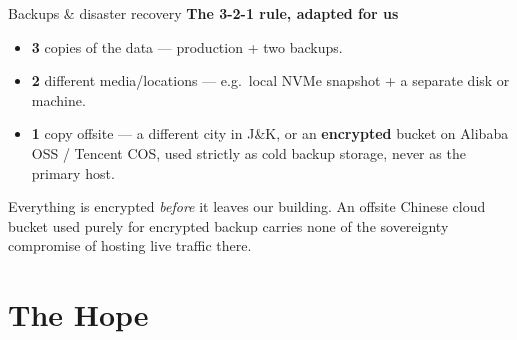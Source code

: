 \documentclass[aspectratio=169,10pt]{beamer}
\newcommand{\eyebrow}[1]{{\small\color{sovGold}\textbf{#1}}}
\begin{document}
\begin{frame}{Backups \& disaster recovery}
  \eyebrow{The 3-2-1 rule, adapted for us}
  \begin{itemize}
    \item \textbf{3} copies of the data --- production + two backups.
    \item \textbf{2} different media/locations --- e.g.\ local NVMe snapshot + a separate disk or machine.
    \item \textbf{1} copy offsite --- a different city in J\&K, or an \textbf{encrypted} bucket on Alibaba OSS / Tencent COS, used strictly as cold backup storage, never as the primary host.
  \end{itemize}
  \vspace{10pt}
  \begin{takeaway}
   Everything is encrypted \emph{before} it leaves our building. An offsite Chinese cloud bucket used purely for encrypted backup carries none of the sovereignty compromise of hosting live traffic there.
  \end{takeaway}
\end{frame}

\section{The Hope}
\end{document}
